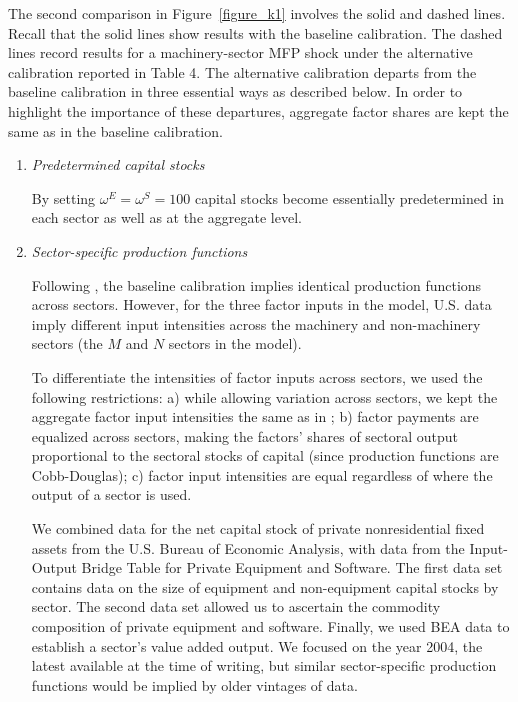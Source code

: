 \documentclass[12pt,fleqn]{article}
\begin{document}
{\normalsize \label{alternative_calibration} }

{\normalsize The second comparison in Figure~\ref{figure_k1} involves the
solid and dashed lines. Recall that the solid lines show results with the
baseline calibration. The dashed lines record results for a machinery-sector
MFP shock under the alternative calibration reported in Table 4. The
alternative calibration departs from the baseline calibration in three
essential ways as described below. In order to highlight the importance of
these departures, aggregate factor shares are kept the same as in the
baseline calibration. }

\begin{enumerate}
\item {\normalsize \emph{Predetermined capital stocks}  }

{\normalsize By setting $\omega ^{E}=\omega ^{S}=100$ capital stocks become essentially
predetermined in each sector as well as at the aggregate level. }

\item {\normalsize \emph{Sector-specific production functions}  }

{\normalsize Following , the baseline calibration
implies identical production functions across sectors. However, for the
three factor inputs in the model, U.S. data imply different input
intensities across the machinery and non-machinery sectors (the $M$ and $N$
sectors in the model).  }

\normalsize To differentiate the intensities of factor inputs across
sectors, we used the following restrictions: a) while allowing variation
across sectors, we kept the aggregate factor input intensities the same as
in ; b) factor payments are equalized across sectors,
making the factors' shares of sectoral output proportional to the sectoral
stocks of capital (since production functions are Cobb-Douglas); c) factor
input intensities are equal regardless of where the output of a sector is
used.

We combined data for the net capital stock of private
nonresidential fixed assets from the U.S. Bureau of Economic Analysis, with
data from the Input-Output Bridge Table for Private Equipment and Software.
The first data set contains data on the size of equipment and non-equipment
capital stocks by sector. The second data set allowed us to ascertain the
commodity composition of private equipment and software. Finally, we used
BEA data to establish a sector's value added output. We focused on the year
2004, the latest available at the time of writing, but similar
sector-specific production functions would be implied by older vintages of
data.


\end{enumerate}
\end{document}
